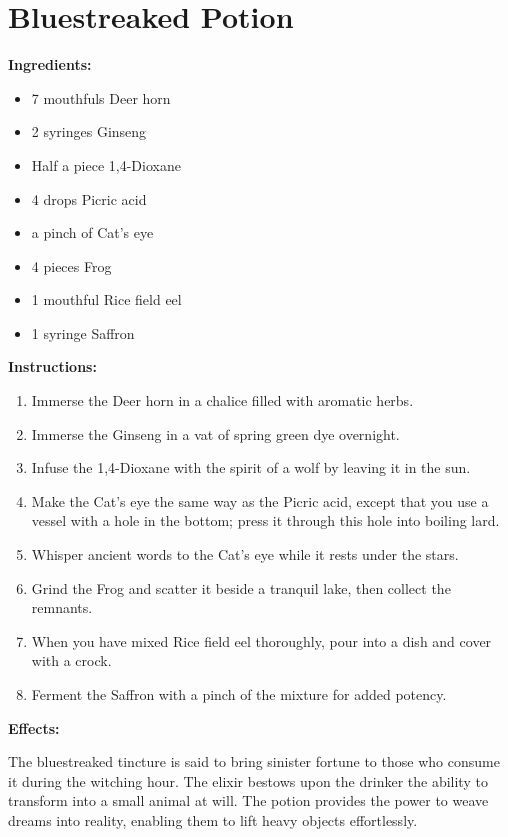 \documentclass{article}
\begin{document}
\newpage
\section*{Bluestreaked Potion}

\textbf{Ingredients:}

\begin{itemize}
  \item 7 mouthfuls Deer horn
  \item 2 syringes Ginseng
  \item Half a piece 1,4-Dioxane
  \item 4 drops Picric acid
  \item a pinch of Cat's eye
  \item 4 pieces Frog
  \item 1 mouthful Rice field eel
  \item 1 syringe Saffron
\end{itemize}

\textbf{Instructions:}

\begin{enumerate}
  \item Immerse the Deer horn in a chalice filled with aromatic herbs.
  \item Immerse the Ginseng in a vat of spring green dye overnight.
  \item Infuse the 1,4-Dioxane with the spirit of a wolf by leaving it in the sun.
  \item Make the Cat's eye the same way as the Picric acid, except that you use a vessel with a hole in the bottom; press it through this hole into boiling lard.
  \item Whisper ancient words to the Cat's eye while it rests under the stars.
  \item Grind the Frog and scatter it beside a tranquil lake, then collect the remnants.
  \item When you have mixed Rice field eel thoroughly, pour into a dish and cover with a crock.
  \item Ferment the Saffron with a pinch of the mixture for added potency.
\end{enumerate}

\textbf{Effects:}

The bluestreaked tincture is said to bring sinister fortune to those who consume it during the witching hour. The elixir bestows upon the drinker the ability to transform into a small animal at will. The potion provides the power to weave dreams into reality, enabling them to lift heavy objects effortlessly.
\end{document}
